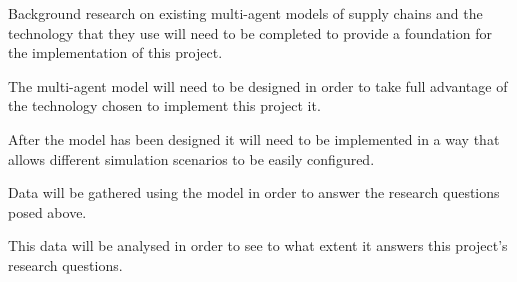 \begin{description}[style=nextline]
    \item [Literature Review] Background research on existing multi-agent models of supply chains and the technology that they use will need to be completed to provide a foundation for the implementation of this project.
    \item [Model Design] The multi-agent model will need to be designed in order to take full advantage of the technology chosen to implement this project it.
    \item [Model Implementation] After the model has been designed it will need to be implemented in a way that allows different simulation scenarios to be easily configured.
    \item [Data Gathering] Data will be gathered using the model in order to answer the research questions posed above.
    \item [Analysis] This data will be analysed in order to see to what extent it answers this project's research questions.
\end{description}
